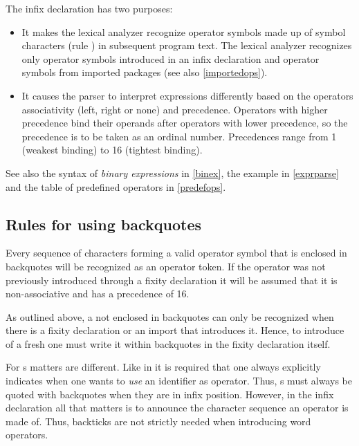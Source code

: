 The infix declaration has two purposes:

\begin{itemize}
\item It makes the lexical analyzer recognize operator symbols made up of symbol characters (rule ) in subsequent program text. The lexical analyzer recognizes only operator symbols introduced in an infix declaration and operator symbols from imported packages (see also \autoref{importedops}).

\item It causes the parser to interpret expressions differently based on the operators associativity (left, right or none) and precedence.
Operators with higher precedence bind their operands after operators with lower precedence, so the precedence is to be taken as an ordinal number.
Precedences range from 1 (weakest binding) to 16 (tightest binding).

\end{itemize}

See also the syntax of \emph{binary expressions} in \autoref{binex}, the example in \autoref{exprparse} and the table of predefined operators in \autoref{predefops}.

\subsection{Rules for using backquotes}

Every sequence of characters forming a valid operator symbol that is enclosed in backquotes will be recognized as an operator token. If the operator was not previously introduced through a fixity declaration it will be assumed that it is non-associative and has a precedence of 16.

As outlined above, a  not enclosed in backquotes can only be recognized when there is a fixity declaration or an import that introduces it. Hence, to introduce of a fresh  one must write it within backquotes in the fixity declaration itself.

For s matters are different. Like in \haskell{} it is required that one always explicitly indicates when one wants to \textit{use} an identifier as operator. Thus, s must always be quoted with backquotes when they are in infix position. However, in the infix declaration all that matters is to announce the character sequence an operator is made of. Thus, backticks are not strictly needed when introducing word operators.

